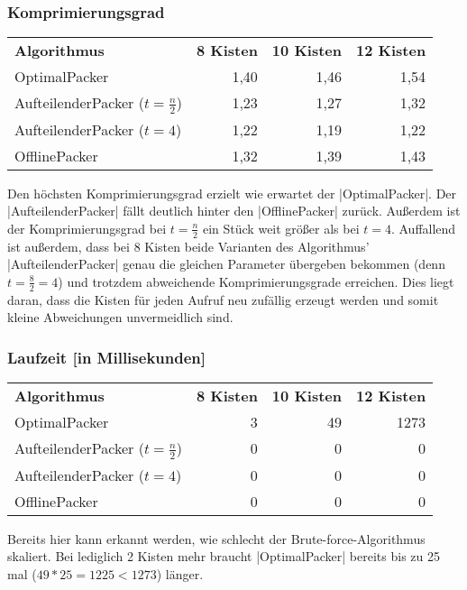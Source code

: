 \subsubsection*{Komprimierungsgrad}
\begin{center}
\begin{tabular}{lrrr}
\textbf{Algorithmus} 	& \textbf{8 Kisten} 	& \textbf{10 Kisten} 	& \textbf{12 Kisten} \vspace{3.6pt}\\
 OptimalPacker       	& 1,40               	& 1,46              	& 1,54               	\\
 AufteilenderPacker ($t=\frac{n}{2}$)  	& 1,23	& 1,27			& 1,32			\\
 AufteilenderPacker ($t=4$)	 	& 1,22	& 1,19			& 1,22			\\
 OfflinePacker		& 1,32			& 1,39			& 1,43			\\
\end{tabular}
\end{center}
 Den höchsten Komprimierungsgrad erzielt wie erwartet der |OptimalPacker|.
 Der |AufteilenderPacker| fällt deutlich hinter den |OfflinePacker| zurück.
 Außerdem ist der Komprimierungsgrad bei $t=\frac{n}{2}$ ein Stück weit größer als bei $t=4$.
 Auffallend ist außerdem, dass bei 8 Kisten beide Varianten des Algorithmus' |AufteilenderPacker| genau die gleichen Parameter übergeben bekommen (denn $t=\frac{8}{2}=4$)
  und trotzdem abweichende Komprimierungsgrade erreichen. Dies liegt daran, dass die Kisten für jeden Aufruf neu zufällig erzeugt werden und somit kleine Abweichungen unvermeidlich sind.

\subsubsection*{Laufzeit [in Millisekunden]}
\begin{center}
\begin{tabular}{lrrr}
\vspace{3.6pt}
\textbf{Algorithmus} 	& \textbf{8 Kisten} 	& \textbf{10 Kisten} 	& \textbf{12 Kisten} \\
 OptimalPacker       	& 3               	& 49              	& 1273                \\
 AufteilenderPacker ($t=\frac{n}{2}$)  	& 0	& 0			& 0		       \\
 AufteilenderPacker ($t=4$)	 	& 0	& 0			& 0			\\
 OfflinePacker		& 0			& 0			& 0			 \\
\end{tabular}
\end{center}
 Bereits hier kann erkannt werden, wie schlecht der Brute-force-Algorithmus skaliert.
 Bei lediglich 2 Kisten mehr braucht |OptimalPacker| bereits bis zu 25 mal ($49 * 25 = 1225 < 1273$) länger.

